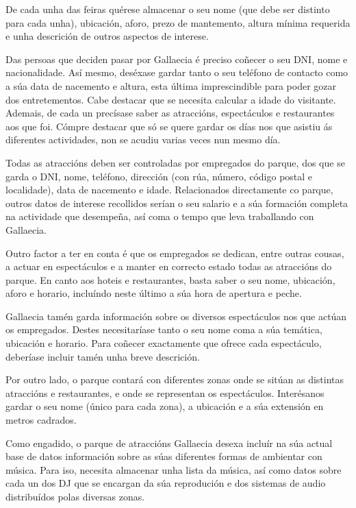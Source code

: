 \documentclass[12pt,a4paper]{book}
\theoremstyle{definition}
\theoremstyle{break}
\begin{document}
	De cada unha das feiras quérese almacenar o seu nome (que debe ser distinto para cada unha), ubicación, aforo, prezo de mantemento, altura mínima requerida e unha descrición de outros aspectos de interese.
	
	Das persoas que deciden pasar por {\logo Gallaecia} é preciso coñecer o seu DNI, nome e nacionalidade. Así mesmo, deséxase gardar tanto o seu teléfono de contacto como a súa data de nacemento e altura, esta última imprescindible para poder gozar dos entretementos. Cabe destacar que se necesita calcular a idade do visitante. Ademais, de cada un precísase saber as atraccións, espectáculos e restaurantes aos que foi. Cómpre destacar que só se quere gardar os días nos que asistiu ás diferentes actividades, non se acudiu varias veces nun mesmo día.
	
	Todas as atraccións deben ser controladas por empregados do parque, dos que se garda o DNI, nome, teléfono, dirección (con rúa, número, código postal e localidade), data de nacemento e idade. Relacionados directamente co parque, outros datos de interese recollidos serían o seu salario e a súa formación completa na actividade que desempeña, así coma o tempo que leva traballando con {\logo Gallaecia}.
	
	Outro factor a ter en conta é que os empregados se dedican, entre outras cousas, a actuar en espectáculos e a manter en correcto estado todas as atraccións do parque. En canto aos hoteis e restaurantes, basta saber o seu nome, ubicación, aforo e horario, incluíndo neste último a súa hora de apertura e peche.
	
	{\logo Gallaecia} tamén garda información sobre os diversos espectáculos nos que actúan os empregados. Destes necesitaríase tanto o seu nome coma a súa temática, ubicación e horario. Para coñecer exactamente que ofrece cada espectáculo, deberíase incluir tamén unha breve descrición.
	
	Por outro lado, o parque contará con diferentes zonas onde se sitúan as distintas atraccións e restaurantes, e onde se representan os espectáculos. Interésanos gardar o seu nome (único para cada zona), a ubicación e a súa extensión en metros cadrados.
	
	Como engadido, o parque de atraccións {\logo Gallaecia} desexa incluír na súa actual base de datos información sobre as súas diferentes formas de ambientar con música. Para iso, necesita almacenar unha lista da música, así como datos sobre cada un dos DJ que
	se encargan da súa reprodución e dos sistemas de audio distribuídos polas
	diversas zonas.
	
\end{document}
